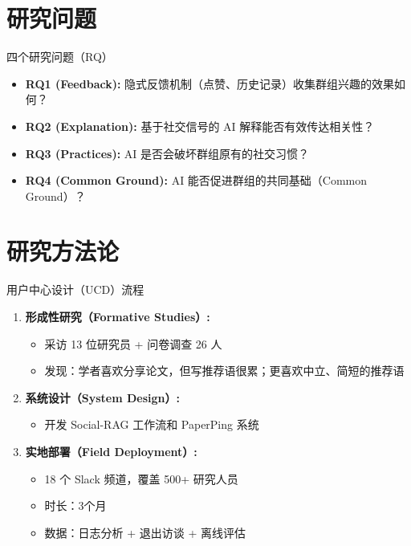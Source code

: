 \documentclass[UTF8,aspectratio=169]{ctexbeamer}
\begin{document}
\section{研究问题}

\begin{frame}{四个研究问题（RQ）}
\begin{itemize}
\item \textbf{RQ1 (Feedback):} 隐式反馈机制（点赞、历史记录）收集群组兴趣的效果如何？
\vspace{0.3cm}
\item \textbf{RQ2 (Explanation):} 基于社交信号的 AI 解释能否有效传达相关性？
\vspace{0.3cm}
\item \textbf{RQ3 (Practices):} AI 是否会破坏群组原有的社交习惯？
\vspace{0.3cm}
\item \textbf{RQ4 (Common Ground):} AI 能否促进群组的共同基础（Common Ground）？
\end{itemize}
\end{frame}

\section{研究方法论}

\begin{frame}{用户中心设计（UCD）流程}
\begin{enumerate}
\item \textbf{形成性研究（Formative Studies）:}
  \begin{itemize}
  \item 采访 13 位研究员 + 问卷调查 26 人
  \item 发现：学者喜欢分享论文，但写推荐语很累；更喜欢\textcolor{myblue}{中立、简短}的推荐语
  \end{itemize}
  
\vspace{0.3cm}

\item \textbf{系统设计（System Design）:}
  \begin{itemize}
  \item 开发 Social-RAG 工作流和 PaperPing 系统
  \end{itemize}
  
\vspace{0.3cm}

\item \textbf{实地部署（Field Deployment）:}
  \begin{itemize}
  \item \textcolor{mygreen}{18 个 Slack 频道}，覆盖 \textcolor{mygreen}{500+ 研究人员}
  \item 时长：\textcolor{mygreen}{3个月}
  \item 数据：日志分析 + 退出访谈 + 离线评估
  \end{itemize}
\end{enumerate}
\end{frame}
\end{document}
